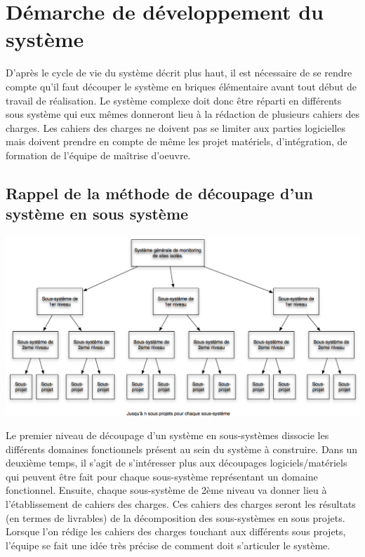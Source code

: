 \section{Démarche de développement du système}
D'après le cycle de vie du système décrit plus haut, il est nécessaire de se rendre compte qu'il faut découper le système en briques élémentaire avant tout début de travail de réalisation. Le système complexe doit donc être réparti en différents sous système qui eux mêmes donneront lieu à la rédaction de plusieurs cahiers des charges. Les cahiers des charges ne doivent pas se limiter aux parties logicielles mais doivent prendre en compte de même les projet matériels, d'intégration, de formation de l'équipe de maîtrise d'oeuvre.

\subsection{Rappel de la méthode de découpage d'un système en sous système}

\begin {center}
\includegraphics[width=\textwidth]{png/decoupageType.png}
\end {center}

Le premier niveau de découpage d'un système en sous-systèmes dissocie les différents domaines fonctionnels présent au sein du système à construire. Dans un deuxième temps, il s'agit de s'intéresser plus aux découpages logiciels/matériels qui peuvent être fait pour chaque sous-système représentant un domaine fonctionnel.
Ensuite, chaque sous-système de 2ème niveau va donner lieu à l'établissement de cahiers des charges. Ces cahiers des charges seront les résultats (en termes de livrables) de la décomposition des sous-systèmes en sous projets. Lorsque l'on rédige les cahiers des charges touchant aux différents sous projets, l'équipe se fait une idée très précise de comment doit s'articuler le système.

